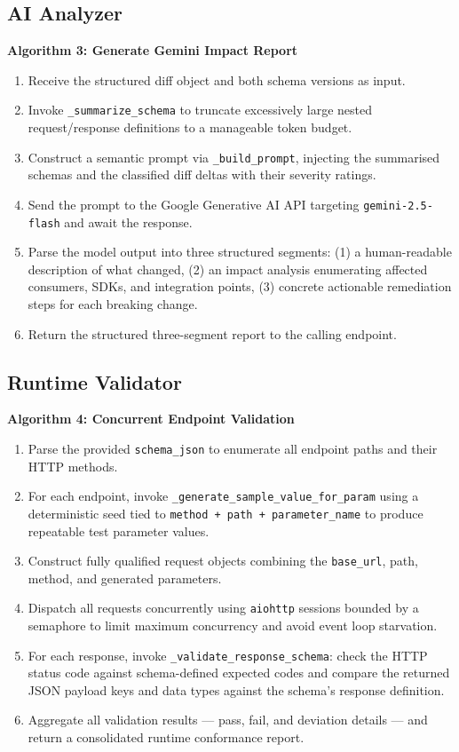 \documentclass{fisatprojectfinal}
\begin{document}
\subsection{AI Analyzer}
\textbf{Algorithm 3: Generate Gemini Impact Report}
\begin{enumerate}[label=\textbf{Step \arabic*:}]
    \item Receive the structured diff object and both schema versions as input.
    \item Invoke \texttt{\_summarize\_schema} to truncate excessively large nested request/response definitions to a manageable token budget.
    \item Construct a semantic prompt via \texttt{\_build\_prompt}, injecting the summarised schemas and the classified diff deltas with their severity ratings.
    \item Send the prompt to the Google Generative AI API targeting \texttt{gemini-2.5-flash} and await the response.
    \item Parse the model output into three structured segments: (1) a human-readable description of what changed, (2) an impact analysis enumerating affected consumers, SDKs, and integration points, (3) concrete actionable remediation steps for each breaking change.
    \item Return the structured three-segment report to the calling endpoint.
\end{enumerate}

\subsection{Runtime Validator}
\textbf{Algorithm 4: Concurrent Endpoint Validation}
\begin{enumerate}[label=\textbf{Step \arabic*:}]
    \item Parse the provided \texttt{schema\_json} to enumerate all endpoint paths and their HTTP methods.
    \item For each endpoint, invoke \texttt{\_generate\_sample\_value\_for\_param} using a deterministic seed tied to \texttt{method + path + parameter\_name} to produce repeatable test parameter values.
    \item Construct fully qualified request objects combining the \texttt{base\_url}, path, method, and generated parameters.
    \item Dispatch all requests concurrently using \texttt{aiohttp} sessions bounded by a semaphore to limit maximum concurrency and avoid event loop starvation.
    \item For each response, invoke \texttt{\_validate\_response\_schema}: check the HTTP status code against schema-defined expected codes and compare the returned JSON payload keys and data types against the schema's response definition.
    \item Aggregate all validation results — pass, fail, and deviation details — and return a consolidated runtime conformance report.
\end{enumerate}
\end{document}
